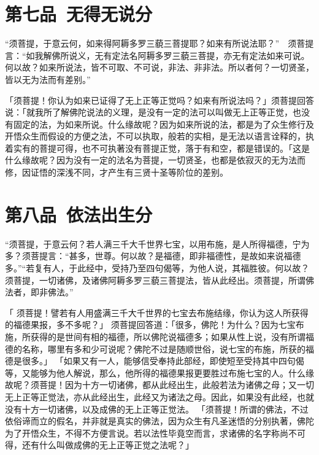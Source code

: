 \documentclass[12pt,twoside,openany]{book}
\newcommand{\kai}[1]{{\CJKfamily{kai}#1}}
\begin{document}
\chapter{第七品\ 无得无说分}
\begin{pinyinscope}
“须菩提，于意云何，如来得阿耨多罗三藐三菩提耶？如来有所说法耶？”　须菩提言：“如我解佛所说义，无有定法名阿耨多罗三藐三菩提，亦无有定法如来可说。何以故？如来所说法，皆不可取、不可说，非法、非非法。所以者何？一切贤圣，皆以无为法而有差别。”
\end{pinyinscope}

\kai{「须菩提！你认为如来已证得了无上正等正觉吗？如来有所说法吗？」须菩提回答说：「就我所了解佛陀说法的义理，是没有一定的法可以叫做无上正等正觉，也没有固定的法，为如来所说。什么缘故呢？因为如来所说的法，都是为了众生修行及开悟众生而假设的方便之法，不可以执取，般若的实相，是无法以语言诠释的，执着实有的菩提可得，也不可执著没有菩提正觉，落于有和空，都是错误的。「这是什么缘故呢？因为没有一定的法名为菩提，一切贤圣，也都是依寂灭的无为法而修，因证悟的深浅不同，才产生有三贤十圣等阶位的差别。}

\chapter{第八品\ 依法出生分}
\begin{pinyinscope}
“须菩提，于意云何？若人满三千大千世界七宝，以用布施，是人所得福德，宁为多？须菩提言：“甚多，世尊。何以故？是福德，即非福德性，是故如来说福德多。”“若复有人，于此经中，受持乃至四句偈等，为他人说，其福胜彼。何以故？须菩提，一切诸佛，及诸佛阿耨多罗三藐三菩提法，皆从此经出。须菩提，所谓佛法者，即非佛法。”
\end{pinyinscope}

\kai{「 须菩提！譬若有人用盛满三千大千世界的七宝去布施结缘，你认为这人所获得的福德果报，多不多呢？」 须菩提回答道：「很多，佛陀！为什么？因为七宝布施，所获得的是世间有相的福德，所以佛陀说福德多；如果从性上说，没有所谓福德的名称，哪里有多和少可说呢？佛陀不过是随顺世俗，说七宝的布施，所获的福德是很多。」 「如果又有一人，能够信受奉持此部经，即使短至受持其中四句偈等，又能够为他人解说，那么，他所得的福德果报更要胜过布施七宝的人。什么缘故呢？须菩提！因为十方一切诸佛，都从此经出生，此般若法为诸佛之母；又一切无上正等正觉法，亦从此经出生，此经又为诸法之母。因此，如果没有此经，也就没有十方一切诸佛，以及成佛的无上正等正觉法。 「须菩提！所谓的佛法，不过依俗谛而立的假名，并非就是真实的佛法，因为众生有凡圣迷悟的分别执著，佛陀为了开悟众生，不得不方便言说。若以法性毕竟空而言，求诸佛的名字称尚不可得，还有什么叫做成佛的无上正等正觉之法呢？」}
\end{document}
